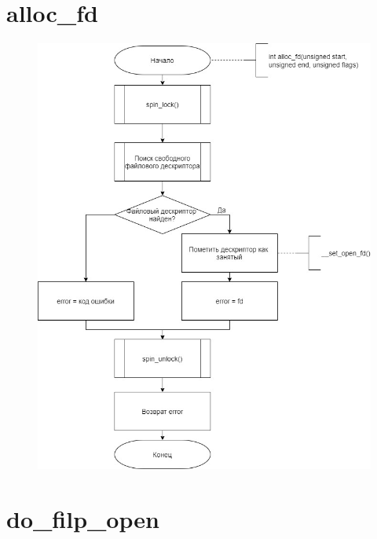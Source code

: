 \documentclass[a4paper,14pt]{extreport}
\begin{document}
\section{alloc\_fd}

\begin{figure}[H]
	\centering
	\includegraphics[scale=0.6]{img/alloc_fd.jpg}
\end{figure}







\section{do\_filp\_open}
\end{document}
